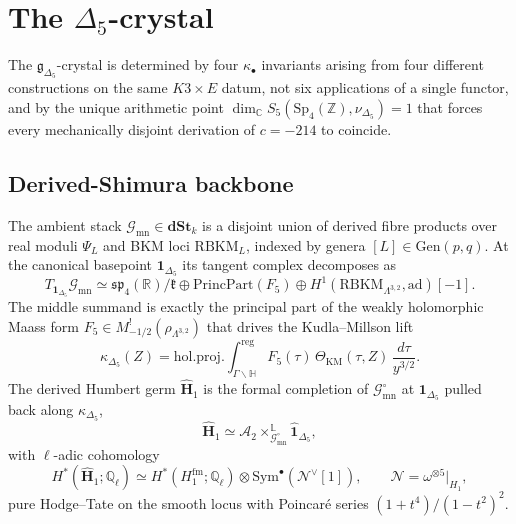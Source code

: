 \section{The \texorpdfstring{$\Delta_5$}{Delta 5}-crystal}
\label{wn:sec:delta5-crystal-synthesis}

\providecommand{\kBKM}{\kappa_{\mathrm{BKM}}}
\providecommand{\kch}{\kappa_{\mathrm{ch}}}
\providecommand{\kcat}{\kappa_{\mathrm{cat}}}
\providecommand{\kfib}{\kappa_{\mathrm{fiber}}}
\providecommand{\fgDelta}{\mathfrak{g}_{\Delta_5}}
\providecommand{\HDelta}{\mathbf{H}_{\Delta_5}}
\providecommand{\MDelta}{\mathcal{M}_{\Delta_5}}
\providecommand{\HatH}{\widehat{\mathbf{H}}_1}
\providecommand{\GMN}{\mathcal{G}_{\mathrm{mn}}}
\providecommand{\ModRigidD}{\mathrm{ModRigidD}}
The $\fgDelta$-crystal is determined by four $\kappa_\bullet$ invariants arising
from four different constructions on the same $K3\times E$ datum, not six
applications of a single functor, and by the unique arithmetic point
$\dim_{\mathbb{C}} S_5(\mathrm{Sp}_4(\mathbb{Z}), \nu_{\Delta_5}) = 1$
that forces every mechanically disjoint derivation of $c = -214$ to coincide.

\subsection{Derived-Shimura backbone}

The ambient stack $\GMN \in \mathbf{dSt}_k$ is a disjoint union of derived
fibre products over real moduli $\Psi_L$ and BKM loci $\mathrm{RBKM}_L$,
indexed by genera $[L] \in \mathrm{Gen}(p, q)$. At the canonical basepoint
$\mathbf{1}_{\Delta_5}$ its tangent complex decomposes as
\[
T_{\mathbf{1}_{\Delta_5}} \GMN
\simeq \mathfrak{sp}_4(\mathbb{R})/\mathfrak{k}
\oplus \mathrm{PrincPart}(F_5)
\oplus H^1(\mathrm{RBKM}_{\Lambda^{3,2}}, \mathrm{ad})[-1].
\]
The middle summand is exactly the principal part of the weakly holomorphic
Maass form $F_5 \in M^!_{-1/2}(\rho_{\Lambda^{3,2}})$ that drives the
Kudla--Millson lift
\[
\kappa_{\Delta_5}(Z)
= \mathrm{hol.proj.}\!\int^{\mathrm{reg}}_{\Gamma\backslash\mathbb{H}}
F_5(\tau)\, \Theta_{\mathrm{KM}}(\tau, Z)\, \frac{d\tau}{y^{3/2}}.
\]
The derived Humbert germ $\HatH$ is the formal completion of $\GMN^\circ$
at $\mathbf{1}_{\Delta_5}$ pulled back along $\kappa_{\Delta_5}$,
\[
\HatH \simeq \mathcal{A}_2 \times^{\mathbb{L}}_{\GMN^\circ} \widehat{\mathbf{1}}_{\Delta_5},
\]
with $\ell$-adic cohomology
\[
H^*(\HatH; \mathbb{Q}_\ell)
\simeq H^*(H_1^{\mathrm{fm}}; \mathbb{Q}_\ell) \otimes \mathrm{Sym}^\bullet(\mathcal{N}^\vee[1]),
\qquad \mathcal{N} = \omega^{\otimes 5}|_{H_1},
\]
pure Hodge--Tate on the smooth locus with Poincar\'e series $(1+t^4)/(1-t^2)^2$.

